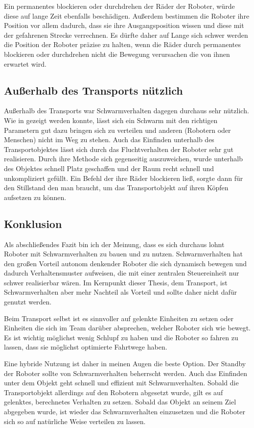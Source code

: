 Ein permanentes blockieren oder durchdrehen der Räder der Roboter, würde diese auf lange Zeit ebenfalls beschädigen. Außerdem bestimmen die Roboter ihre Position vor allem dadurch, dass sie ihre Ausgangsposition wissen und diese mit der gefahrenen Strecke verrechnen. Es dürfte daher auf Lange sich schwer werden die Position der Roboter präzise zu halten, wenn die Räder durch permanentes blockieren oder durchdrehen nicht die Bewegung verursachen die von ihnen erwartet wird.



\subsection*{Außerhalb des Transports nützlich}
Außerhalb des Transports war Schwarmverhalten dagegen durchaus sehr nützlich. Wie in  gezeigt werden konnte, lässt sich ein Schwarm mit den richtigen Parametern gut dazu bringen sich zu verteilen und anderen (Robotern oder Menschen) nicht im Weg zu stehen. Auch das Einfinden unterhalb des Transportobjektes lässt sich durch das Fluchtverhalten der Roboter sehr gut realisieren. Durch ihre Methode sich gegenseitig auszuweichen, wurde unterhalb des Objektes schnell Platz geschaffen und der Raum recht schnell und unkompliziert gefüllt. Ein Befehl der ihre Räder blockieren ließ, sorgte dann für den Stillstand den man braucht, um das Transportobjekt auf ihren Köpfen aufsetzen zu können.



\subsection*{Konklusion}
Als abschließendes Fazit bin ich der Meinung, dass es sich durchaus lohnt Roboter mit Schwarmverhalten zu bauen und zu nutzen. Schwarmverhalten hat den großen Vorteil autonom denkender Roboter die sich dynamisch bewegen und dadurch Verhaltensmuster aufweisen, die mit einer zentralen Steuereinheit nur schwer realisierbar wären. Im Kernpunkt dieser Thesis, dem Transport, ist Schwarmverhalten aber mehr Nachteil als Vorteil und sollte daher nicht dafür genutzt werden.

Beim Transport selbst ist es sinnvoller auf gelenkte Einheiten zu setzen oder Einheiten die sich im Team darüber absprechen, welcher Roboter sich wie bewegt. Es ist wichtig möglichst wenig Schlupf zu haben und die Roboter so fahren zu lassen, dass sie möglichst optimierte Fahrtwege haben.

Eine hybride Nutzung ist daher in meinen Augen die beste Option. Der Standby der Roboter sollte von Schwarmverhalten beherrscht werden. Auch das Einfinden unter dem Objekt geht schnell und effizient mit Schwarmverhalten. Sobald die Transportobjekt allerdings auf den Robotern abgesetzt wurde, gilt es auf gelenktes, berechnetes Verhalten zu setzen. Sobald das Objekt an seinem Ziel abgegeben wurde, ist wieder das Schwarmverhalten einzusetzen und die Roboter sich so auf natürliche Weise verteilen zu lassen.





